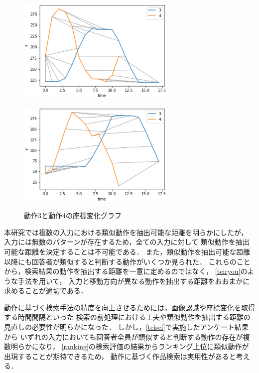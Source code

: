 \documentclass[11pt]{jreport}
\begin{document}
\begin{figure}[H]
    \centering
    \begin{minipage}{0.45\linewidth}
        \centering
        \includegraphics[height=5cm]{3-4-x.eps}
        \label{3-4-x}
    \end{minipage}
    \hspace{0.04\columnwidth}
    \begin{minipage}{0.45\linewidth}
        \centering
        \includegraphics[height=5cm]{3-4-y.eps}
        \label{3-4-y}
    \end{minipage}
    \hspace{0.04\columnwidth}
    \caption{動作3と動作4の座標変化グラフ}
    \label{3-4}
\end{figure}

本研究では複数の入力における類似動作を抽出可能な距離を明らかにしたが，
入力には無数のパターンが存在するため，全ての入力に対して
類似動作を抽出可能な距離を決定することは不可能である．
また，類似動作を抽出可能な距離以降にも回答者が類似すると判断する動作がいくつか見られた．
これらのことから，検索結果の動作を抽出する距離を一意に定めるのではなく，
\ref{teiryou}のような手法を用いて，
入力と移動方向が異なる動作を抽出する距離をおおまかに求めることが適切である．

動作に基づく検索手法の精度を向上させるためには，画像認識や座標変化を取得する時間間隔といった
検索の前処理における工夫や類似動作を抽出する距離の見直しの必要性が明らかになった．
しかし，\ref{teisei}で実施したアンケート結果から
いずれの入力においても回答者全員が類似すると判断する動作の存在が複数明らかになり，
\ref{ranking}の検索評価の結果からランキング上位に類似動作が出現することが期待できるため，
動作に基づく作品検索は実用性があると考える．
\end{document}
